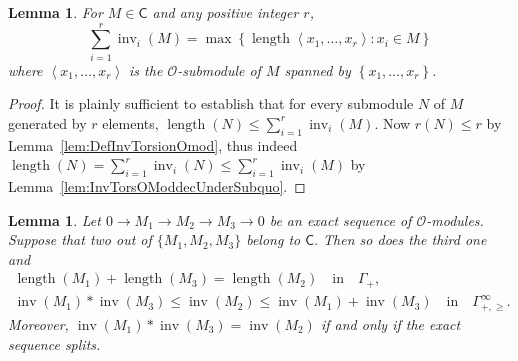 \documentclass[11pt]{article}
\newtheorem{lemm}[theo]{Lemma}
\theoremstyle{definition}
\numberwithin{equation}{section}
\numberwithin{figure}{section}
\numberwithin{table}{section}
\DeclareMathOperator{\inv}{inv}
\DeclareMathOperator{\length}{length}
\newcommand{\sfC}{\mathsf{C}}
\begin{document}
\begin{lemm}\label{lem:InvTorsOMod_Formula}
For $M\in\sfC$ and any positive integer $r$,
\[
\sum_{i=1}^{r}\inv_{i}(M)=\max\left\{ \length\left\langle x_{1},\dots,x_{r}\right\rangle :x_{i}\in M\right\}
\]
where $\left\langle x_{1},\dots,x_{r}\right\rangle $ is the $\mathcal{O}$-submodule of $M$ spanned by $\left\{ x_{1},\dots,x_{r}\right\} $.
\end{lemm}
\begin{proof}
It is plainly sufficient to establish that for every submodule $N$ of $M$ generated by $r$ elements, $\length(N)\leq\sum_{i=1}^{r}\inv_{i}(M)$. Now $r(N)\leq r$ by Lemma~\ref{lem:DefInvTorsionOmod}, thus indeed $\length(N)=\sum_{i=1}^{r}\inv_{i}(N)\leq\sum_{i=1}^{r}\inv_{i}(M)$ by Lemma~\ref{lem:InvTorsOModdecUnderSubquo}.
\end{proof}

\begin{lemm}\label{lem:InvTorsOModAndExactSeq}
Let $0\rightarrow M_{1}\rightarrow M_{2}\rightarrow M_{3}\rightarrow0$ be an exact sequence of $\mathcal{O}$-modules. Suppose that two out of $\{M_{1},M_{2},M_{3}\}$ belong to $\sfC.$ Then so does the third one and
\begin{gather*}
\length(M_{1})+\length(M_{3})=\length(M_{2})\quad\text{in}\quad\Gamma_{+},\\
\inv(M_{1})\ast\inv(M_{3})\leq\inv(M_{2})\le\inv(M_{1})+\inv(M_{3})\quad\text{in}\quad\Gamma_{+,\geq}^{\infty}.
\end{gather*}
Moreover, $\inv(M_{1})\ast\inv(M_{3})=\inv(M_{2})$ if and only if the exact sequence splits.
\end{lemm}
\end{document}
